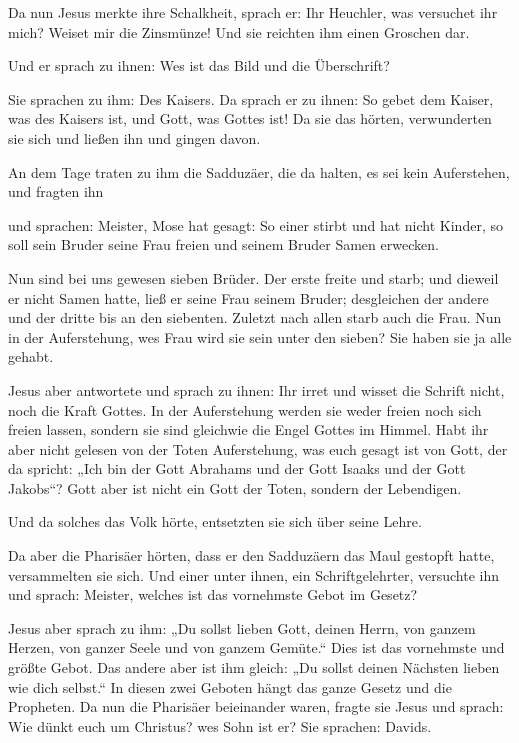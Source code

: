  Da nun Jesus merkte ihre Schalkheit, sprach er: Ihr
Heuchler, was versuchet ihr mich?  Weiset mir die
Zinsmünze! Und sie reichten ihm einen Groschen dar.

 Und er sprach zu ihnen: Wes ist das Bild und die
Überschrift?

 Sie sprachen zu ihm: Des Kaisers. Da sprach er zu ihnen:
So gebet dem Kaiser, was des Kaisers ist, und Gott, was Gottes ist!
 Da sie das hörten, verwunderten sie sich und ließen ihn
und gingen davon.

 An dem Tage traten zu ihm die Sadduzäer, die da halten,
es sei kein Auferstehen, und fragten ihn

 und sprachen: Meister, Mose hat gesagt: So einer stirbt
und hat nicht Kinder, so soll sein Bruder seine Frau freien und seinem
Bruder Samen erwecken.

 Nun sind bei uns gewesen sieben Brüder. Der erste freite
und starb; und dieweil er nicht Samen hatte, ließ er seine Frau seinem
Bruder;  desgleichen der andere und der dritte bis an den
siebenten.  Zuletzt nach allen starb auch die Frau.
 Nun in der Auferstehung, wes Frau wird sie sein unter
den sieben? Sie haben sie ja alle gehabt.

 Jesus aber antwortete und sprach zu ihnen: Ihr irret und
wisset die Schrift nicht, noch die Kraft Gottes.  In der
Auferstehung werden sie weder freien noch sich freien lassen, sondern
sie sind gleichwie die Engel Gottes im Himmel.  Habt ihr
aber nicht gelesen von der Toten Auferstehung, was euch gesagt ist von
Gott, der da spricht:  „Ich bin der Gott Abrahams und der
Gott Isaaks und der Gott Jakobs``? Gott aber ist nicht ein Gott der
Toten, sondern der Lebendigen.

 Und da solches das Volk hörte, entsetzten sie sich über
seine Lehre.

 Da aber die Pharisäer hörten, dass er den Sadduzäern das
Maul gestopft hatte, versammelten sie sich.  Und einer
unter ihnen, ein Schriftgelehrter, versuchte ihn und sprach:
 Meister, welches ist das vornehmste Gebot im Gesetz?

 Jesus aber sprach zu ihm: „Du sollst lieben Gott, deinen
Herrn, von ganzem Herzen, von ganzer Seele und von ganzem Gemüte.``
 Dies ist das vornehmste und größte Gebot.
 Das andere aber ist ihm gleich: „Du sollst deinen
Nächsten lieben wie dich selbst.``  In diesen zwei
Geboten hängt das ganze Gesetz und die Propheten.  Da nun
die Pharisäer beieinander waren, fragte sie Jesus  und
sprach: Wie dünkt euch um Christus? wes Sohn ist er? Sie sprachen:
Davids.

